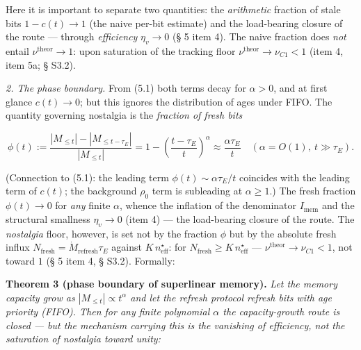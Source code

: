 \documentclass[12pt]{iopart}
\begin{document}
Here it is important to separate two quantities: the \emph{arithmetic} fraction of stale bits \(1-c(t)\to1\) (the naive per-bit estimate) and the load-bearing closure of the route --- through \emph{efficiency} \(\eta_v\to0\) (§ 5 item 4). The naive fraction does \emph{not} entail \(\nu^{\text{theor}} \to 1\): upon saturation of the tracking floor \(\nu^{\text{theor}} \to \nu_{C1} < 1\) (item 4, item 5a; § S3.2).



\emph{2. The phase boundary.} From (5.1) both terms decay for \(\alpha > 0\), and at first glance \(c(t) \to 0\); but this ignores the distribution of ages under FIFO. The quantity governing nostalgia is the \emph{fraction of fresh bits}



\begin{equation}\phi(t) := \frac{|M_{\le t}| - |M_{\le t-\tau_E}|}{|M_{\le t}|} = 1 - \left(\frac{t-\tau_E}{t}\right)^\alpha \approx \frac{\alpha\tau_E}{t} \quad(\alpha = O(1),\ t \gg \tau_E). \tag{5.2}\end{equation}



(Connection to (5.1): the leading term \(\phi(t) \sim \alpha\tau_E/t\) coincides with the leading term of \(c(t)\); the background \(\rho_0\) term is subleading at \(\alpha \ge 1\).) The fresh fraction \(\phi(t) \to 0\) for \emph{any} finite \(\alpha\), whence the inflation of the denominator \(I_{\text{mem}}\) and the structural smallness \(\eta_v \to 0\) (item 4) --- the load-bearing closure of the route. The \emph{nostalgia} floor, however, is set not by the fraction \(\phi\) but by the absolute fresh influx \(N_{\text{fresh}} = \dot M_{\text{refresh}}\tau_E\) against \(K\,n_{\text{eff}}^\star\): for \(N_{\text{fresh}} \ge K\,n_{\text{eff}}^\star\) --- \(\nu^{\text{theor}} \to \nu_{C1} < 1\), not toward \(1\) (§ 5 item 4, § S3.2). Formally:



\textbf{Theorem 3 (phase boundary of superlinear memory).} \emph{Let the memory capacity grow as \(|M_{\le t}| \propto t^\alpha\) and let the refresh protocol refresh bits with age priority (FIFO). Then for any finite polynomial \(\alpha\) the capacity-growth route is closed --- but the mechanism carrying this is the vanishing of efficiency, not the saturation of nostalgia toward unity:}
\end{document}
